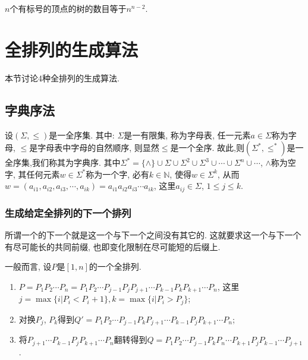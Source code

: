     \begin{theorem}[Cayley定理] \rm
        $n$个有标号的顶点的树的数目等于$n^{n-2}$.
    \end{theorem}


\section{全排列的生成算法}

    本节讨论4种全排列的生成算法.

    \subsection{字典序法}

        \begin{definition}[字典序]
            设$(\Sigma,\leqslant)$是一全序集. 其中: $\Sigma$是一有限集, 称为\textsf{字母表}, 任一元素$a\in\Sigma$称为\textsf{字母}, $\leqslant$是字母表中字母的\textsf{自然顺序}, 则显然$\leqslant$是一个\textsf{全序}. 故此,则$(\Sigma^*,\leqslant^*)$是一\textsf{全序集},我们称其为\textsf{字典序}. 其中$\Sigma^*=\{\wedge\}\cup\Sigma\cup\Sigma^2\cup\Sigma^3\cup\cdots\cup\Sigma^n\cup\cdots$, $\wedge$称为空字, 其任何元素$w\in\Sigma^*$称为一个字, 必有$k\in\mathbb{N}$, 使得$w\in\Sigma^k$, 从而$w=(a_{i1},a_{i2},a_{i3},\cdots,a_{ik})=a_{i1}a_{i2}a_{i3}\cdots a_{ik}$, 这里$a_{ij}\in\Sigma$, $1\leqslant j\leqslant k$.
        \end{definition}

        \subsubsection{生成给定全排列的下一个排列}

            所谓一个的下一个就是这一个与下一个之间没有其它的. 这就要求这一个与下一个有尽可能长的共同前缀, 也即变化限制在尽可能短的后缀上. 
            
            \begin{algorithm}[在字典序中求一个排列的下一个排列]
                 一般而言, 设$P$是$[1,n]$的一个全排列. 
                 \begin{enumerate}
                     \item $P=P_1P_2\cdots P_n=P_1P_2\cdots P_{j-1}P_{j}P_{j+1}\cdots P_{k-1}P_kP_{k+1}\cdots P_n$, 这里$j=\max\{i|P_i<P_i+1\}, k=\max\{i|P_i>P_j\}$;
                     \item 对换$P_j$, $P_k$得到$Q'=P_1P_2\cdots P_{j-1}P_kP_{j+1}\cdots P_{k-1}P_jP_{k+1}\cdots P_n$;
                     \item 将$P_{j+1}\cdots P_{k-1}P_jP_{k+1}\cdots P_n$翻转得到$Q=P_1P_2\cdots P_{j-1}P_kP_n\cdots P_{k+1}P_jP_{k-1}\cdots P_{j+1}$.
                 \end{enumerate}
             \end{algorithm}

